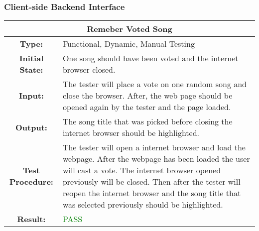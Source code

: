 \documentclass[12pt, titlepage]{article}
\begin{document}
\subsubsection{Client-side Backend Interface}


\begin{center}
\begin{table}[H]
\begin{tabularx}{\textwidth}{| c X |}
\hline
\multicolumn{2}{|c|}{\textbf{Remeber Voted Song}}\\
\hline
\textbf{Type: } & Functional, Dynamic, Manual Testing\\


\textbf{Initial State: } & One song should have been voted and the internet browser closed.\\


\textbf{Input: } & The tester will place a vote on one random song and close the browser. After, the web page should be opened again by the tester and the page loaded.\\


\textbf{Output: } & The song title that was picked before closing the internet browser should be highlighted.\\


\textbf{Test Procedure: } & The tester will open a internet browser and load the webpage. After the webpage has been loaded the user will cast a vote. The internet browser opened previously will be closed. Then after the tester will reopen the internet browser and the song title that was selected previously should be highlighted.\\


\textbf{Result: } & \textcolor{green}{PASS}\\
\hline
\end{tabularx}
\end{table}
\end{center}
\end{document}
